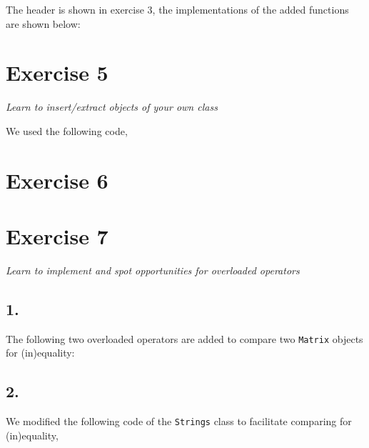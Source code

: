 \documentclass[12pt]{article}
\newcommand{\desc}[1]{\textit{#1} \vspace{1em}}
\begin{document}
The header is shown in exercise 3, the implementations of the added functions are shown below:






\clearpage
\section*{Exercise 5}
\desc{Learn to insert/extract objects of your own class}

We used the following code,








\clearpage
\section*{Exercise 6}
\desc{}

\clearpage
\section*{Exercise 7}
\desc{Learn to implement and spot opportunities for overloaded operators}
\subsection*{1.}
The following two overloaded operators are added to compare two \texttt{Matrix} objects for (in)equality:


\subsection*{2.}
We modified the following code of the \texttt{Strings} class to facilitate comparing for (in)equality,



\end{document}
